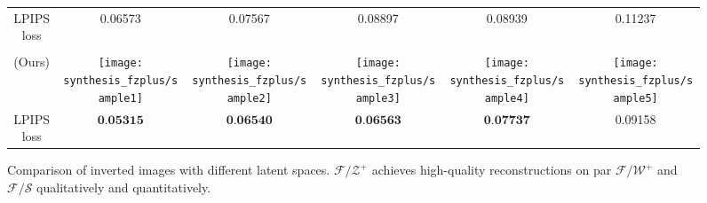\documentclass[10pt,twocolumn,letterpaper]{article}
\newcommand{\PNS}{\mathcal{P}_{\mathcal{N}}}
\newcommand{\FWS}{\mathcal{F}/\mathcal{W}^{+}}
\newcommand{\FZS}{\mathcal{F}/\mathcal{Z}^{+}}
\newcommand{\FSS}{\mathcal{F}/\mathcal{S}}
\begin{document}
\begin{figure}
\begin{tabular}{cccccc}
\footnotesize LPIPS loss & \footnotesize 0.06573 & \footnotesize 0.07567 & \footnotesize 0.08897 & \footnotesize 0.08939 & \footnotesize 0.11237 \\
\raisebox{1.2em}{\shortstack{$\mathcal{F}/\mathcal{Z}^{+}$ \\ (Ours)}} & 
\texttt{[image: synthesis\_fzplus/sample1]} &
\texttt{[image: synthesis\_fzplus/sample2]} &
\texttt{[image: synthesis\_fzplus/sample3]} &
\texttt{[image: synthesis\_fzplus/sample4]} &
\texttt{[image: synthesis\_fzplus/sample5]} \\
\footnotesize LPIPS loss & \footnotesize $\textbf{0.05315}$ & \footnotesize $\textbf{0.06540}$ & \footnotesize $\textbf{0.06563}$ & \footnotesize $\textbf{0.07737}$ & \footnotesize 0.09158 \\
    \end{tabular}\egroup
\vspace{-0.4em}
    \caption{Comparison of inverted images with different latent spaces.
      $\FZS$ achieves high-quality reconstructions on par $\FWS$ and $\FSS$ qualitatively and quantitatively.\vspace{-2.0em}}\label{fig:recon}
\end{figure}

\vspace{-0.4em}
\begin{table}
\centering
\caption{Quantitative comparison of reconstruction quality. Our $\FZS$ yields performance comparable to $\FWS(\PNS)$.\vspace{-0.4em}}\label{tb:recon}
\bgroup
{}
\egroup
\end{table}
\vspace{-0.4em}
\end{document}
